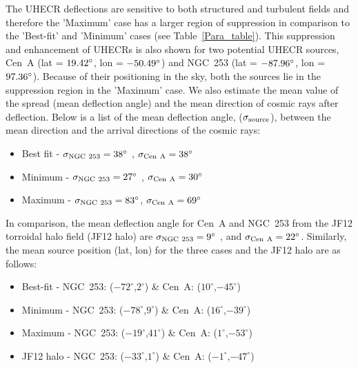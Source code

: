 \documentclass[usenatbib]{mnras}
\begin{document}
The UHECR deflections are sensitive to both structured and turbulent fields and therefore the 'Maximum' case has a larger region of suppression in comparison to the 'Best-fit' and 'Minimum' cases (see Table~\ref{Para_table}). This suppression and enhancement of UHECRs is also shown for two potential UHECR sources, Cen~A (lat = $\rm 19.42^{\circ}$, lon = $\rm -50.49^{\circ}$) and NGC~253 (lat = $\rm -87.96^{\circ}$, lon = $\rm 97.36^{\circ}$). Because of their positioning in the sky, both the sources lie in the suppression region in the 'Maximum' case. We also estimate the mean value of the spread (mean deflection angle) and the mean direction of cosmic rays after deflection. Below is a list of the mean deflection angle, ($\sigma_{\rm source}$), between the mean direction and the arrival directions of the cosmic rays:
\begin{itemize}
        \item Best fit - $\sigma_{\rm NGC~253} = 38^{\circ}$ , {$\sigma_{\rm Cen~A} = 38^{\circ}$}
        \item Minimum - $\sigma_{\rm NGC~253} = 27^{\circ}$ , $\sigma_{\rm Cen~A} = 30^{\circ}$
        \item Maximum - $\sigma_{\rm NGC~253} = 83^{\circ}$, $\sigma_{\rm Cen~A} = 69^{\circ}$
\end{itemize}
In comparison, the mean deflection angle for Cen~A and NGC~253 from the JF12 torroidal halo field (JF12 halo) \citep{JF12}  are  $\sigma_{\rm NGC~253} = 9^{\circ}$ , and {$\sigma_{\rm Cen~A} = 22^{\circ}$}. 
Similarly, the mean source position (lat, lon) for the three cases and the JF12 halo are as follows:
\begin{itemize}
    \item Best-fit - NGC~253: ($-72^{\circ}$,$2^{\circ}$) \& Cen~A: ($10^{\circ}$,$-45^{\circ}$) 
    \item Minimum - NGC~253: ($-78^{\circ}$,$9^{\circ}$) \& Cen~A: ($16^{\circ}$,$-39^{\circ}$) 
    \item Maximum - NGC~253: ($-19^{\circ}$,$41^{\circ}$) \& Cen~A: ($1^{\circ}$,$-53^{\circ}$) 
    \item JF12 halo - NGC~253: ($-33^{\circ}$,$1^{\circ}$) \& Cen~A: ($-1^{\circ}$,$-47^{\circ}$) 
\end{itemize}
\end{document}
